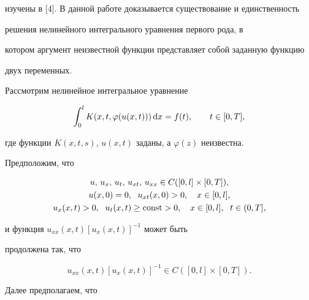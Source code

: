 изучены в [4]. В данной работе доказывается существование и единственность


решения нелинейного интегрального уравнения первого рода, в


котором аргумент неизвестной функции представляет собой заданную функцию


двух переменных.





Рассмотрим нелинейное интегральное уравнение


\begin{equation}


\int_0^l K(x,t,\varphi (u(x,t)))\d x=f(t),\qq t\in [0,T],




\end{equation}


где функции $K(x,t,s)$, $u(x,t)$ заданы, а $\varphi(z)$ неизвестна.





Предположим, что


\begin{gather}


u,\,u_x,\,u_t,\,u_{xt},\,u_{xx}\in C([0,l]\times[0,T]),




\\


u(x,0)=0,\ \;u_{xt}(x,0)>0,\q x\in [ 0,l],




\\


u_x(x,t)>0,\ \; u_t(x,t)\geq \const>0,\q x\in [


0,l],\ \;


t\in ( 0,T],




\end{gather}


и функция $u_{xx}(x,t)[u_x(x,t)]^{-1}$ может быть


продолжена так, что


\begin{equation}


u_{xx}(x,t)[u_x(x,t)]^{-1} \in C([0,l] \times [0,T]).




\end{equation}


Далее предполагаем, что


